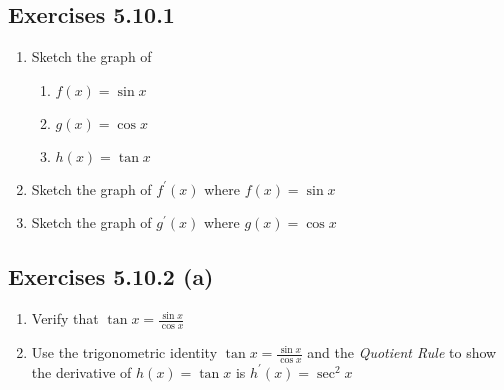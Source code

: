 \subsection{Exercises 5.10.1}
\begin{enumerate}
	\item Sketch the graph of 
	
	
	\begin{enumerate}
		\item $f (x) =\sin  x$ 
		
		\item $g (x) =\cos  x$ 
		
		\item $h (x) =\tan  x$ \end{enumerate}
	
	
	\item Sketch the graph of $f^{ \prime } (x)$ where $f (x) =\sin  x$ 
	
	\item Sketch the graph of $g^{ \prime } (x)$ where $g (x) =\cos  x$ \end{enumerate}


\subsection{Exercises 5.10.2 (a)}
\begin{enumerate}
	\item Verify that $\tan  x =\frac{\sin  x}{\cos  x}$ 
	
	\item Use the trigonometric identity $\tan  x =\frac{\sin  x}{\cos  x}$ and the \emph{Quotient Rule }to show the derivative of $h (x) =\tan  x$ is $h^{ \prime } (x) =\sec ^{2} x$ \end{enumerate}




